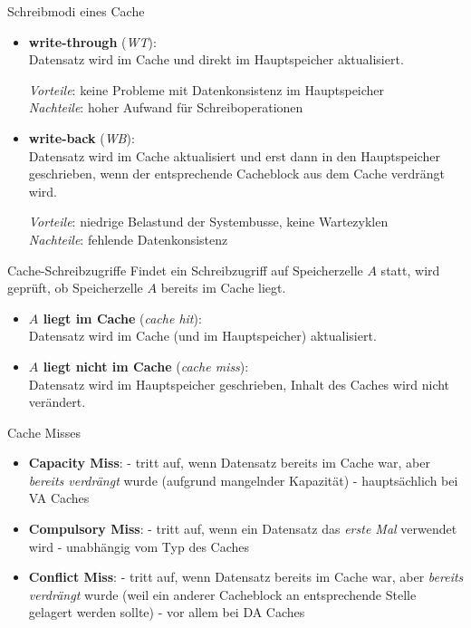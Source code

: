 \begin{defi}{Schreibmodi eines Cache}
    \begin{itemize}
        \item \textbf{write-through} (\emph{WT}):\\
              Datensatz wird im Cache und direkt im Hauptspeicher aktualisiert.

              \emph{Vorteile}: keine Probleme mit Datenkonsistenz im Hauptspeicher\\
              \emph{Nachteile}: hoher Aufwand für Schreiboperationen
        \item \textbf{write-back} (\emph{WB}):\\
              Datensatz wird im Cache aktualisiert und erst dann in den Hauptspeicher geschrieben, wenn der entsprechende Cacheblock aus dem Cache verdrängt wird.

              \emph{Vorteile}: niedrige Belastund der Systembusse, keine Wartezyklen\\
              \emph{Nachteile}: fehlende Datenkonsistenz
    \end{itemize}
\end{defi}

\begin{defi}{Cache-Schreibzugriffe}
    Findet ein Schreibzugriff auf Speicherzelle $A$ statt, wird geprüft, ob Speicherzelle $A$ bereits im Cache liegt.
    \begin{itemize}
        \item \textbf{$A$ liegt im Cache} (\emph{cache hit}):\\
              Datensatz wird im Cache (und im Hauptspeicher) aktualisiert.
        \item \textbf{$A$ liegt nicht im Cache} (\emph{cache miss}):\\
              Datensatz wird im Hauptspeicher geschrieben, Inhalt des Caches wird nicht verändert.
    \end{itemize}
\end{defi}

\begin{defi}{Cache Misses}
    \begin{itemize}
        \item \textbf{Capacity Miss}:
              \subitem - tritt auf, wenn Datensatz bereits im Cache war, aber \emph{bereits verdrängt} wurde
              \subitem (aufgrund mangelnder Kapazität)
              \subitem - hauptsächlich bei VA Caches
        \item \textbf{Compulsory Miss}:
              \subitem - tritt auf, wenn ein Datensatz das \emph{erste Mal} verwendet wird
              \subitem - unabhängig vom Typ des Caches
        \item \textbf{Conflict Miss}:
              \subitem - tritt auf, wenn Datensatz bereits im Cache war, aber \emph{bereits verdrängt} wurde
              \subitem (weil ein anderer Cacheblock an entsprechende Stelle gelagert werden sollte)
              \subitem - vor allem bei DA Caches
    \end{itemize}
\end{defi}

